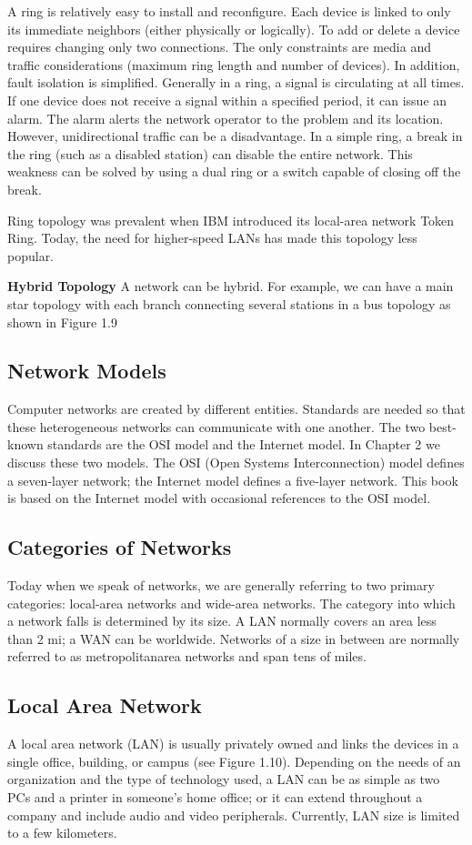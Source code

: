 A ring is relatively easy to install and reconfigure. Each device is linked to only its immediate neighbors (either physically or logically). To add or delete a device requires changing only two connections. The only constraints are media and traffic considerations (maximum ring length and number of devices). In addition, fault isolation is simplified. Generally in a ring, a signal is circulating at all times. If one device does not receive a signal within a specified period, it can issue an alarm. The alarm alerts the network operator to the problem and its location. However, unidirectional traffic can be a disadvantage. In a simple ring, a break in the ring (such as a disabled station) can disable the entire network. This weakness can be solved by using a dual ring or a switch capable of closing off the break.

Ring topology was prevalent when IBM introduced its local-area network Token Ring. Today, the need for higher-speed LANs has made this topology less popular.

\textbf{Hybrid Topology} A network can be hybrid. For example, we can have a main star topology with each branch connecting several stations in a bus topology as shown in Figure 1.9

\subsection{Network Models}
Computer networks are created by different entities. Standards are needed so that these heterogeneous networks can communicate with one another. The two best-known standards are the OSI model and the Internet model. In Chapter 2 we discuss these two models. The OSI (Open Systems Interconnection) model defines a seven-layer network; the Internet model defines a five-layer network. This book is based on the Internet model with occasional references to the OSI model.

\subsection{Categories of Networks}
Today when we speak of networks, we are generally referring to two primary categories: local-area networks and wide-area networks. The category into which a network falls is determined by its size. A LAN normally covers an area less than 2 mi; a WAN can be worldwide. Networks of a size in between are normally referred to as metropolitanarea networks and span tens of miles.

\subsection*{Local Area Network}
A local area network (LAN) is usually privately owned and links the devices in a single office, building, or campus (see Figure 1.10). Depending on the needs of an organization and the type of technology used, a LAN can be as simple as two PCs and a printer in someone's home office; or it can extend throughout a company and include audio and video peripherals. Currently, LAN size is limited to a few kilometers.

